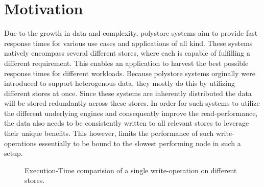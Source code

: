
\section{Motivation}

Due to the growth in data and complexity, polystore systems aim to provide fast response times for various use cases and applications of all kind.
These systems natively encompass several different stores, where each is capable of fulfilling a different requirement. 
This enables an application to harvest the best possible response times for different workloads.
Because polystore systems orginally were introduced to support heterogenous data, they mostly do this by utilizing different stores at once.
Since these systems are inherently distributed the data will be stored redundantly across these stores. 
In order for such systems to utilize the different underlying engines and consequently improve the read-performance, 
the data also needs to be consistently written to all relevant stores to leverage their unique benefits.
This however, limits the performance of such write-operations essentially to be bound to the slowest performing node in such a setup.

 

\begin{figure}[t] 
    \centering 
\caption{Execution-Time comparision of a single write-operation on different stores.}
\label{fig:stores}
\end{figure}


